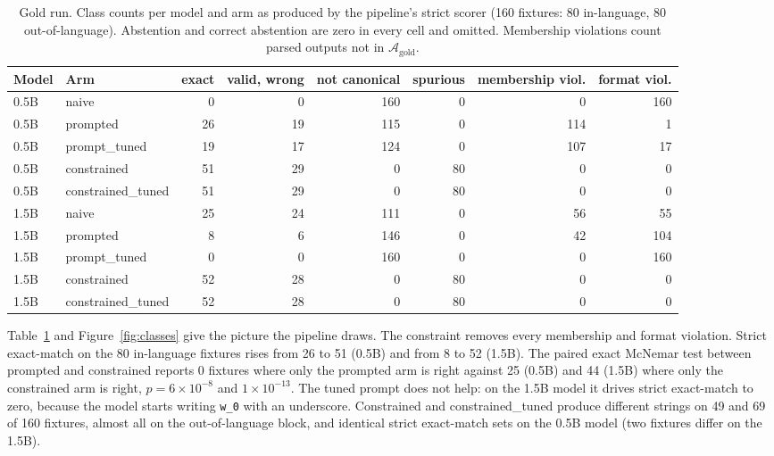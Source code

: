 \documentclass[11pt]{article}
\begin{document}
\begin{table}[t]
\centering
\caption{Gold run. Class counts per model and arm as produced by the pipeline's strict scorer (160 fixtures: 80 in-language, 80 out-of-language). Abstention and correct abstention are zero in every cell and omitted. Membership violations count parsed outputs not in $\mathcal{A}_{\mathrm{gold}}$.}
\label{tab:classes}
\footnotesize
\setlength{\tabcolsep}{4pt}
\begin{tabular}{llrrrrrr}
\toprule
Model & Arm & exact & valid, wrong & not canonical & spurious & membership viol. & format viol. \\
\midrule
0.5B & naive & 0 & 0 & 160 & 0 & 0 & 160 \\
0.5B & prompted & 26 & 19 & 115 & 0 & 114 & 1 \\
0.5B & prompt\_tuned & 19 & 17 & 124 & 0 & 107 & 17 \\
0.5B & constrained & 51 & 29 & 0 & 80 & 0 & 0 \\
0.5B & constrained\_tuned & 51 & 29 & 0 & 80 & 0 & 0 \\
\midrule
1.5B & naive & 25 & 24 & 111 & 0 & 56 & 55 \\
1.5B & prompted & 8 & 6 & 146 & 0 & 42 & 104 \\
1.5B & prompt\_tuned & 0 & 0 & 160 & 0 & 0 & 160 \\
1.5B & constrained & 52 & 28 & 0 & 80 & 0 & 0 \\
1.5B & constrained\_tuned & 52 & 28 & 0 & 80 & 0 & 0 \\
\bottomrule
\end{tabular}
\end{table}

Table~\ref{tab:classes} and Figure~\ref{fig:classes} give the picture the pipeline draws. The constraint removes every membership and format violation. Strict exact-match on the 80 in-language fixtures rises from 26 to 51 (0.5B) and from 8 to 52 (1.5B). The paired exact McNemar test between prompted and constrained reports 0 fixtures where only the prompted arm is right against 25 (0.5B) and 44 (1.5B) where only the constrained arm is right, $p = 6\times10^{-8}$ and $1\times10^{-13}$. The tuned prompt does not help: on the 1.5B model it drives strict exact-match to zero, because the model starts writing \texttt{w\_0} with an underscore. Constrained and constrained\_tuned produce different strings on 49 and 69 of 160 fixtures, almost all on the out-of-language block, and identical strict exact-match sets on the 0.5B model (two fixtures differ on the 1.5B).
\end{document}
